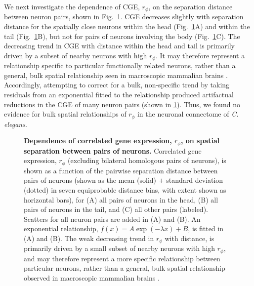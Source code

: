 We next investigate the dependence of CGE, $r_\phi$, on the separation distance between neuron pairs, shown in Fig.~\ref{fig:Ch2Fig4}.
CGE decreases slightly with separation distance for the spatially close neurons within the head (Fig.~\ref{fig:Ch2Fig4}A) and within the tail (Fig.~\ref{fig:Ch2Fig4}B), but not for pairs of neurons involving the body (Fig.~\ref{fig:Ch2Fig4}C).
The decreasing trend in CGE with distance within the head and tail is primarily driven by a subset of nearby neurons with high $r_\phi$.
It may therefore represent a relationship specific to particular functionally related neurons, rather than a general, bulk spatial relationship seen in macroscopic mammalian brains \citep{Fulcher2016}.
Accordingly, attempting to correct for a bulk, non-specific trend by taking residuals from an exponential fitted to the relationship produced artifactual reductions in the CGE of many neuron pairs (shown in \ref{fig:Ch2Fig4}).
Thus, we found no evidence for bulk spatial relationships of $r_\phi$ in the neuronal connectome of \emph{C. elegans}.

\begin{figure}[h]
  \caption{
  \textbf{Dependence of correlated gene expression, $r_\phi$, on spatial separation between pairs of neurons.}
  Correlated gene expression, $r_\phi$ (excluding bilateral homologous pairs of neurons), is shown as a function of the pairwise separation distance between pairs of neurons (shown as the mean (solid) $\pm$ standard deviation (dotted) in seven equiprobable distance bins, with extent shown as horizontal bars), for (A) all pairs of neurons in the head, (B) all pairs of neurons in the tail, and (C) all other pairs (labeled).
  Scatters for all neuron pairs are added in (A) and (B).
  An exponential relationship, $f(x) = A\exp(-\lambda x) + B$, is fitted in (A) and (B).
  The weak decreasing trend in $r_\phi$ with distance, is primarily driven by a small subset of nearby neurons with high $r_\phi$, and may therefore represent a more specific relationship between particular neurons, rather than a general, bulk spatial relationship observed in macroscopic mammalian brains \citep{Fulcher2016, Krienen2016}.}
\label{fig:Ch2Fig4}
\end{figure}

